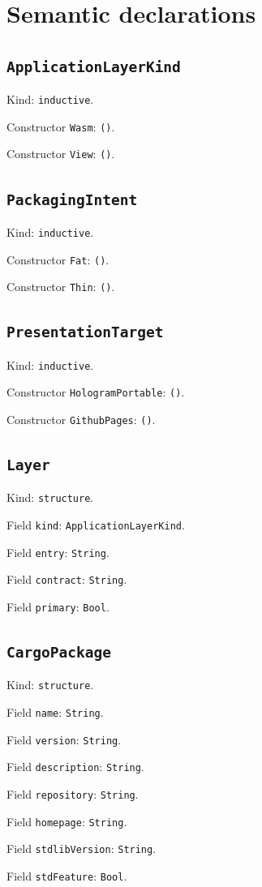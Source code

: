 \documentclass[11pt]{article}
\begin{document}
\section*{Semantic declarations}
\subsection*{\texttt{ApplicationLayerKind}}
\noindent Kind: \texttt{inductive}.\par
\noindent Constructor \texttt{Wasm}: \texttt{()}.\par
\noindent Constructor \texttt{View}: \texttt{()}.\par
\subsection*{\texttt{PackagingIntent}}
\noindent Kind: \texttt{inductive}.\par
\noindent Constructor \texttt{Fat}: \texttt{()}.\par
\noindent Constructor \texttt{Thin}: \texttt{()}.\par
\subsection*{\texttt{PresentationTarget}}
\noindent Kind: \texttt{inductive}.\par
\noindent Constructor \texttt{HologramPortable}: \texttt{()}.\par
\noindent Constructor \texttt{GithubPages}: \texttt{()}.\par
\subsection*{\texttt{Layer}}
\noindent Kind: \texttt{structure}.\par
\noindent Field \texttt{kind}: \texttt{ApplicationLayerKind}.\par
\noindent Field \texttt{entry}: \texttt{String}.\par
\noindent Field \texttt{contract}: \texttt{String}.\par
\noindent Field \texttt{primary}: \texttt{Bool}.\par
\subsection*{\texttt{CargoPackage}}
\noindent Kind: \texttt{structure}.\par
\noindent Field \texttt{name}: \texttt{String}.\par
\noindent Field \texttt{version}: \texttt{String}.\par
\noindent Field \texttt{description}: \texttt{String}.\par
\noindent Field \texttt{repository}: \texttt{String}.\par
\noindent Field \texttt{homepage}: \texttt{String}.\par
\noindent Field \texttt{stdlibVersion}: \texttt{String}.\par
\noindent Field \texttt{stdFeature}: \texttt{Bool}.\par
\end{document}
